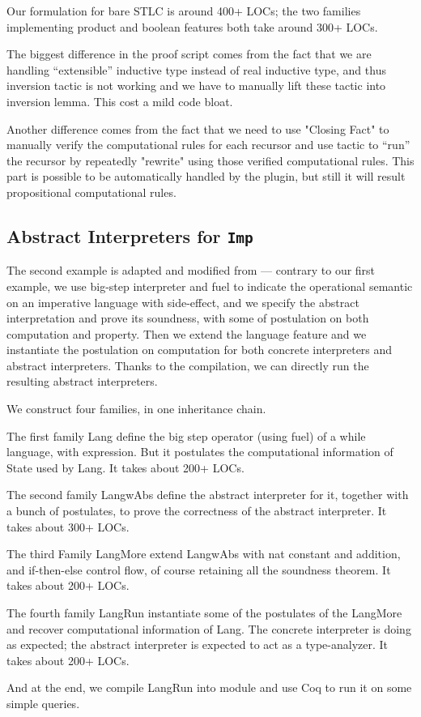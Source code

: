 Our formulation for bare STLC is around 400+ LOCs; the two families implementing product and boolean features both take around 300+ LOCs. 

The biggest difference in the proof script comes from the fact that we are handling ``extensible'' inductive type instead of real inductive type, and thus inversion tactic is not working and we have to manually lift these tactic into inversion lemma. This cost a mild code bloat. 

Another difference comes from the fact that we need to use "Closing Fact" to manually verify the computational rules for each recursor and use tactic to ``run'' the recursor by repeatedly "rewrite" using those verified computational rules. This part is possible to be automatically handled by the plugin, but still it will result propositional computational rules.  

\subsection{Abstract Interpreters for \texttt{Imp}}
The second example is adapted and modified from \citet{zm2017}
--- contrary to our first example, we use big-step interpreter and fuel to indicate the operational semantic on an imperative language with side-effect, and we specify the abstract interpretation and prove its soundness, with some of postulation on both computation and property. Then we extend the language feature and we instantiate the postulation on computation for both concrete interpreters and abstract interpreters. Thanks to the compilation, we can directly run the resulting abstract interpreters.

We construct four families, in one inheritance chain. 


The first family Lang define the big step operator (using fuel) of a while language, with expression. But it postulates the computational information of State used by Lang. It takes about 200+ LOCs.

The second family LangwAbs define the abstract interpreter for it, together with a bunch of postulates, to prove the correctness of the abstract interpreter. It takes about 300+ LOCs. 

The third Family LangMore extend LangwAbs with nat constant and addition, and if-then-else control flow, of course retaining all the soundness theorem. It takes about 200+ LOCs.

The fourth family LangRun instantiate some of the postulates of the LangMore and recover computational information of Lang. The concrete interpreter is doing as expected; the abstract interpreter is expected to act as a type-analyzer. It takes about 200+ LOCs.


And at the end, we compile LangRun into module and use Coq to run it on some simple queries. 